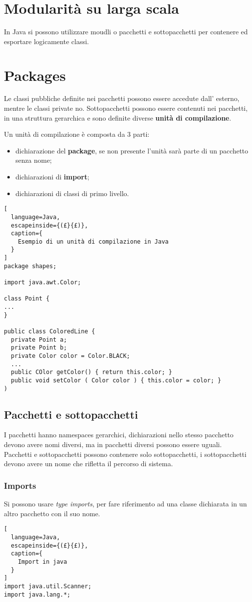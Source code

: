 \section{Modularità su larga scala}
In Java si possono utilizzare moudli o pacchetti e sottopacchetti per contenere
ed esportare logicamente classi.

\section{Packages}
Le classi pubbliche definite nei pacchetti possono essere accedute dall' 
esterno, mentre le classi private no.
Sottopacchetti possono essere contenuti nei pacchetti, in una struttura 
gerarchica e sono definite diverse \textbf{unità di compilazione}.

Un unità di compilazione è composta da $3$ parti:
\begin{itemize}
  \item dichiarazione del \textbf{package}, se non presente l'unità sarà parte 
    di un pacchetto senza nome;
  \item dichiarazioni di \textbf{import};
  \item dichiarazioni di classi di primo livello.
\end{itemize}

\begin{lstlisting}[
  language=Java,
  escapeinside={(£}{£)},
  caption={
    Esempio di un unità di compilazione in Java
  }
]
package shapes;

import java.awt.Color;

class Point {
...
}

public class ColoredLine {
  private Point a;
  private Point b;
  private Color color = Color.BLACK;
  ...
  public COlor getColor() { return this.color; }
  public void setColor ( Color color ) { this.color = color; }
)
\end{lstlisting}

\subsection{Pacchetti e sottopacchetti}
I pacchetti hanno namespaces gerarchici, dichiarazioni nello stesso pacchetto
devono avere nomi diversi, ma in pacchetti diversi possono essere uguali.
Pacchetti e sottopacchetti possono contenere solo sottopacchetti, i 
sottopacchetti devono avere un nome che rifletta il percorso di sistema.

\subsubsection{Imports}
Si possono usare \emph{type imports}, per fare riferimento ad una classe 
dichiarata in un altro pacchetto con il suo nome.
\begin{lstlisting}[
  language=Java,
  escapeinside={(£}{£)},
  caption={
    Import in java
  }
]
import java.util.Scanner;
import java.lang.*;
\end{lstlisting}

